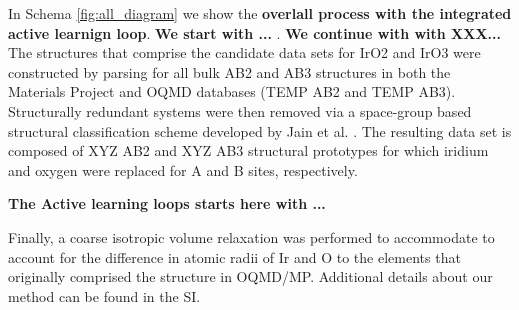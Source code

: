 



In Schema \ref{fig:all_diagram} we show the {\bf overlall process with the integrated active learnign loop}. {\bf We start with ...} .  {\bf We continue with  with XXX...}
The structures that comprise the candidate data sets for IrO2 and IrO3 were constructed by parsing for all bulk AB2 and AB3 structures in both the Materials Project\cite{Jain2013} and OQMD\cite{Kirklin2015} databases (TEMP AB2 and TEMP AB3).
%
Structurally redundant systems were then removed via a space-group based structural classification scheme developed by Jain et al. \cite{Jain2018}.
%
The resulting data set is composed of XYZ AB2 and XYZ AB3 structural prototypes for which iridium and oxygen were replaced for A and B sites, respectively.
%

{\bf The Active learning loops starts here with ...}

Finally, a coarse isotropic volume relaxation was performed to accommodate to account for the difference in atomic radii of Ir and O to the elements that originally comprised the structure in OQMD/MP.
%
 Additional details about our method can be found in the SI.

